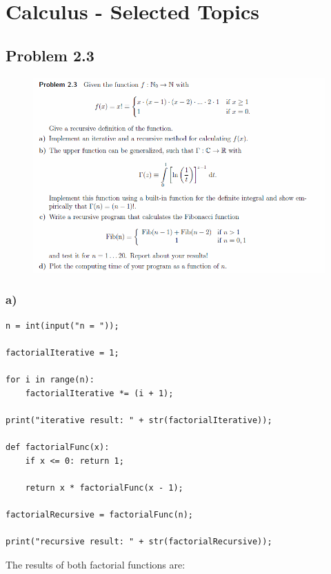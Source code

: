 \section{Calculus - Selected Topics}


\subsection{Problem 2.3}


\begin{figure}[!ht]
\includegraphics[width=1\textwidth]{chapters/images/desc-2-3}
\end{figure}


\subsubsection{a)}

\begin{lstlisting}[caption=Problem 2.3 a)]
n = int(input("n = "));

factorialIterative = 1;

for i in range(n):
    factorialIterative *= (i + 1);

print("iterative result: " + str(factorialIterative));

def factorialFunc(x):
    if x <= 0: return 1;
	
    return x * factorialFunc(x - 1);

factorialRecursive = factorialFunc(n);

print("recursive result: " + str(factorialRecursive));
\end{lstlisting}

The results of both factorial functions are:


